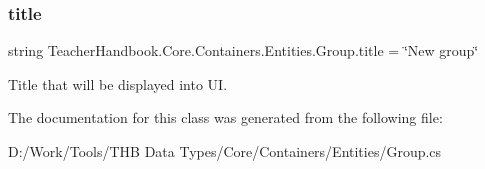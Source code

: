 \subsubsection{\texorpdfstring{title}{title}}
{\footnotesize\ttfamily string Teacher\+Handbook.\+Core.\+Containers.\+Entities.\+Group.\+title = \char`\"{}New group\char`\"{}}



Title that will be displayed into UI. 



The documentation for this class was generated from the following file\+:\begin{DoxyCompactItemize}
\item 
D\+:/\+Work/\+Tools/\+T\+H\+B Data Types/\+Core/\+Containers/\+Entities/Group.\+cs\end{DoxyCompactItemize}

